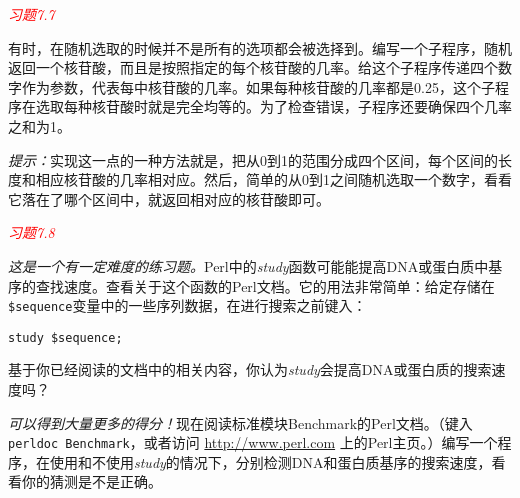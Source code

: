 \textcolor{red}{\textit{习题7.7}}
\begin{adjustwidth}{4em}{}
有时，在随机选取的时候并不是所有的选项都会被选择到。编写一个子程序，随机返回一个核苷酸，而且是按照指定的每个核苷酸的几率。给这个子程序传递四个数字作为参数，代表每中核苷酸的几率。如果每种核苷酸的几率都是0.25，这个子程序在选取每种核苷酸时就是完全均等的。为了检查错误，子程序还要确保四个几率之和为1。

\textit{提示：}实现这一点的一种方法就是，把从0到1的范围分成四个区间，每个区间的长度和相应核苷酸的几率相对应。然后，简单的从0到1之间随机选取一个数字，看看它落在了哪个区间中，就返回相对应的核苷酸即可。
\end{adjustwidth}

\textcolor{red}{\textit{习题7.8}}
\begin{adjustwidth}{4em}{}
\textit{这是一个有一定难度的练习题。}Perl中的\textit{study}函数可能能提高DNA或蛋白质中基序的查找速度。查看关于这个函数的Perl文档。它的用法非常简单：给定存储在 \verb|$sequence|变量中的一些序列数据，在进行搜索之前键入：

\begin{lstlisting}
study $sequence;
\end{lstlisting}

基于你已经阅读的文档中的相关内容，你认为\textit{study}会提高DNA或蛋白质的搜索速度吗？
\end{adjustwidth}

\textit{可以得到大量更多的得分！}现在阅读标准模块Benchmark的Perl文档。（键入 \verb|perldoc Benchmark|，或者访问 \href{http://www.perl.com}{http://www.perl.com} 上的Perl主页。）编写一个程序，在使用和不使用\textit{study}的情况下，分别检测DNA和蛋白质基序的搜索速度，看看你的猜测是不是正确。
